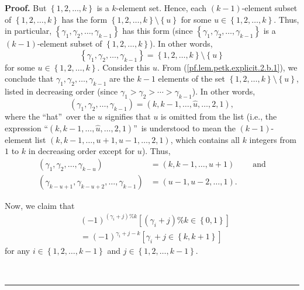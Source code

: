 \documentclass[numbers=enddot,12pt,final,onecolumn,notitlepage]{scrartcl}%
\theoremstyle{definition}
\newenvironment{proof}[1][Proof]{\noindent\textbf{#1.} }{\ \rule{0.5em}{0.5em}}
\newenvironment{verlong}{}{}
\begin{document}
\begin{proof}
\begin{verlong}
But $\left\{  1,2,\ldots,k\right\}  $ is a $k$-element set. Hence, each
$\left(  k-1\right)  $-element subset of $\left\{  1,2,\ldots,k\right\}  $ has
the form $\left\{  1,2,\ldots,k\right\}  \setminus\left\{  u\right\}  $ for
some $u\in\left\{  1,2,\ldots,k\right\}  $. Thus, in particular, $\left\{
\gamma_{1},\gamma_{2},\ldots,\gamma_{k-1}\right\}  $ has this form (since
$\left\{  \gamma_{1},\gamma_{2},\ldots,\gamma_{k-1}\right\}  $ is a $\left(
k-1\right)  $-element subset of $\left\{  1,2,\ldots,k\right\}  $). In other
words,%
\begin{equation}
\left\{  \gamma_{1},\gamma_{2},\ldots,\gamma_{k-1}\right\}  =\left\{
1,2,\ldots,k\right\}  \setminus\left\{  u\right\}
\label{pf.lem.petk.explicit.2.b.1}%
\end{equation}
for some $u\in\left\{  1,2,\ldots,k\right\}  $. Consider this $u$. From
(\ref{pf.lem.petk.explicit.2.b.1}), we conclude that $\gamma_{1},\gamma
_{2},\ldots,\gamma_{k-1}$ are the $k-1$ elements of the set $\left\{
1,2,\ldots,k\right\}  \setminus\left\{  u\right\}  $, listed in decreasing
order (since $\gamma_{1}>\gamma_{2}>\cdots>\gamma_{k-1}$). In other words,%
\begin{equation}
\left(  \gamma_{1},\gamma_{2},\ldots,\gamma_{k-1}\right)  =\left(
k,k-1,\ldots,\widehat{u},\ldots,2,1\right)  ,
\label{pf.lem.petk.explicit.2.b.2}%
\end{equation}
where the \textquotedblleft hat\textquotedblright\ over the $u$ signifies that
$u$ is omitted from the list (i.e., the expression \textquotedblleft$\left(
k,k-1,\ldots,\widehat{u},\ldots,2,1\right)  $\textquotedblright\ is understood
to mean the $\left(  k-1\right)  $-element list $\left(  k,k-1,\ldots
,u+1,u-1,\ldots,2,1\right)  $, which contains all $k$ integers from $1$ to $k$
in decreasing order except for $u$). Thus,%
\begin{align}
\left(  \gamma_{1},\gamma_{2},\ldots,\gamma_{k-u}\right)   &  =\left(
k,k-1,\ldots,u+1\right)  \ \ \ \ \ \ \ \ \ \ \text{and}%
\label{pf.lem.petk.explicit.2.b.2a}\\
\left(  \gamma_{k-u+1},\gamma_{k-u+2},\ldots,\gamma_{k-1}\right)   &  =\left(
u-1,u-2,\ldots,1\right)  . \label{pf.lem.petk.explicit.2.b.2b}%
\end{align}

\end{verlong}

Now, we claim that%
\begin{align}
&  \left(  -1\right)  ^{\left(  \gamma_{i}+j\right)  \%k}\left[  \left(
\gamma_{i}+j\right)  \%k\in\left\{  0,1\right\}  \right] \nonumber\\
&  =\left(  -1\right)  ^{\gamma_{i}+j-k}\left[  \gamma_{i}+j\in\left\{
k,k+1\right\}  \right]  \label{pf.lem.petk.explicit.2.b.5}%
\end{align}
for any $i\in\left\{  1,2,\ldots,k-1\right\}  $ and $j\in\left\{
1,2,\ldots,k-1\right\}  $.


\end{proof}
\end{document}
